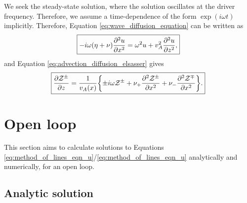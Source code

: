 We seek the steady-state solution, where the solution oscillates at the driver frequency. Therefore, we assume a time-dependence of the form $\exp(i\omega t)$ implicitly. Therefore,
Equation \eqref{eq:wave_diffusion_equation} can be written as
\begin{equation}
    \label{eq:method_of_lines_eqn_u}
    \boxed{-i\omega(\eta+\nu)\pdv[2]{u}{x} = \omega^2u + v_A^2\pdv[2]{u}{z},}
\end{equation}
and Equation \eqref{eq:advection_diffusion_elsasser} gives
\begin{equation}
    \label{eq:chap_3_method_of_lines_eqn}
     \boxed{\pdv{\mathcal{Z}^\pm}{z} = \frac{1}{v_A(x)}\qty{\pm i\omega \mathcal{Z}^{\pm} + \nu_+ \pdv[2]{\mathcal{Z}^\pm}{x} + \nu_-\pdv[2]{\mathcal{Z}^\mp}{x}}.}
\end{equation}

\section{Open loop}
\label{sec:chap_3_open_loop}

This section aims to calculate solutions to Equations \eqref{eq:method_of_lines_eqn_u}/\eqref{eq:method_of_lines_eqn_u} analytically and numerically, for an open loop.

\subsection{Analytic solution}

